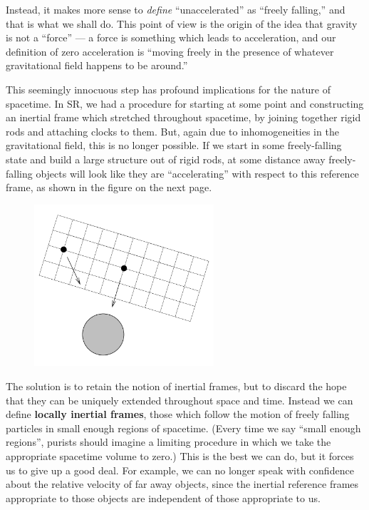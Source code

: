 \documentclass[12pt]{article}
\begin{document}
Instead, it makes more sense to {\it define} ``unaccelerated'' as
``freely falling,'' and that is what we shall do.  This point of 
view is the origin of the idea that gravity is not a ``force'' ---
a force is something which leads to acceleration, and our definition
of zero acceleration is ``moving freely in the presence of whatever
gravitational field happens to be around.''

This seemingly innocuous step has profound implications for the nature
of spacetime.  In SR, we had a procedure for starting at some point
and constructing an inertial frame which stretched throughout spacetime,
by joining together rigid rods and attaching clocks to them.  But, again
due to inhomogeneities in the gravitational field, this is no longer 
possible.  If we start in some freely-falling state and build a large
structure out of rigid rods, at some distance away freely-falling
objects will look like they are ``accelerating'' with respect to this
reference frame, as shown in the figure on the next page.

\eject

\begin{figure}
  \centerline{
  \includegraphics[height=6cm]{pdf/four3}}
\end{figure}

The solution is to retain the notion of inertial frames, but to 
discard the hope that they can be uniquely extended throughout space
and time.  Instead we can define {\bf locally inertial frames}, those
which follow the motion of freely falling particles in small enough
regions of spacetime.  (Every time we say ``small enough regions'',
purists should imagine a limiting procedure in which we take the appropriate
spacetime volume to zero.)  This is the best we can do, but it forces
us to give up a good deal.  For example, we can no longer speak with
confidence about the relative velocity of far away objects, since the
inertial reference frames appropriate to those objects are independent
of those appropriate to us.
\end{document}

